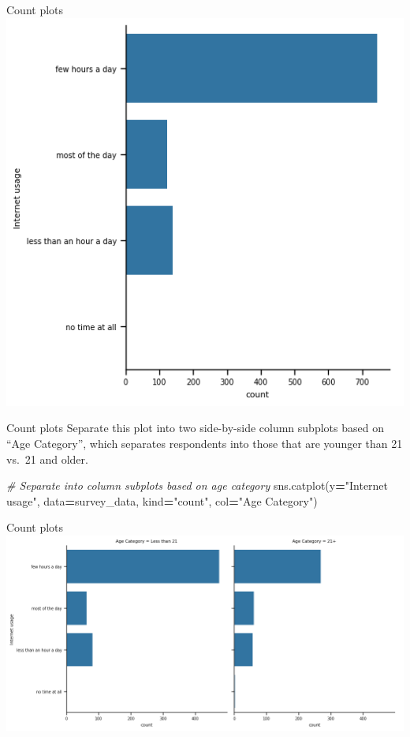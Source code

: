 \documentclass[
  ignorenonframetext,
]{beamer}
\newenvironment{Shaded}{\begin{snugshade}}{\end{snugshade}}
\newcommand{\CommentTok}[1]{\textcolor[rgb]{0.56,0.35,0.01}{\textit{#1}}}
\newcommand{\NormalTok}[1]{#1}
\newcommand{\OperatorTok}[1]{\textcolor[rgb]{0.81,0.36,0.00}{\textbf{#1}}}
\newcommand{\StringTok}[1]{\textcolor[rgb]{0.31,0.60,0.02}{#1}}
\begin{document}
\begin{frame}{Count plots}
\label{count-plots-6}
\includegraphics{../images/im279.png}
\end{frame}

\begin{frame}[fragile]{Count plots}
\label{count-plots-7}
Separate this plot into two side-by-side column subplots based on ``Age
Category'', which separates respondents into those that are younger than
21 vs.~21 and older.


\begin{Shaded}
\begin{Highlighting}[]
\CommentTok{\# Separate into column subplots based on age category}
\NormalTok{sns.catplot(y}\OperatorTok{=}\StringTok{"Internet usage"}\NormalTok{, data}\OperatorTok{=}\NormalTok{survey\_data,}
\NormalTok{            kind}\OperatorTok{=}\StringTok{"count"}\NormalTok{, col}\OperatorTok{=}\StringTok{"Age Category"}\NormalTok{)}
\end{Highlighting}
\end{Shaded}
\end{frame}

\begin{frame}{Count plots}
\label{count-plots-8}
\includegraphics{../images/im280.png}
\end{frame}
\end{document}
